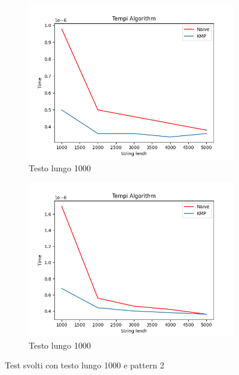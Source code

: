 \begin{figure}[H]
    \centering
    \begin{subfigure}[b]{0.49\textwidth}
        \centering
        \includegraphics[width=\textwidth]{Resources/lenght1000_1.png}
        \caption{Testo lungo 1000}
        \label{fig:lenght1000_1}
    \end{subfigure}
    \hfill
    \begin{subfigure}[b]{0.49\textwidth}
        \centering
        \includegraphics[width=\textwidth]{Resources/lenght1000_2.png}
        \caption{Testo lungo 1000}
        \label{fig:lenght1000_2}
    \end{subfigure}
    \caption{Test svolti con testo lungo 1000 e pattern 2}
    \label{fig:test_1000}
\end{figure}

